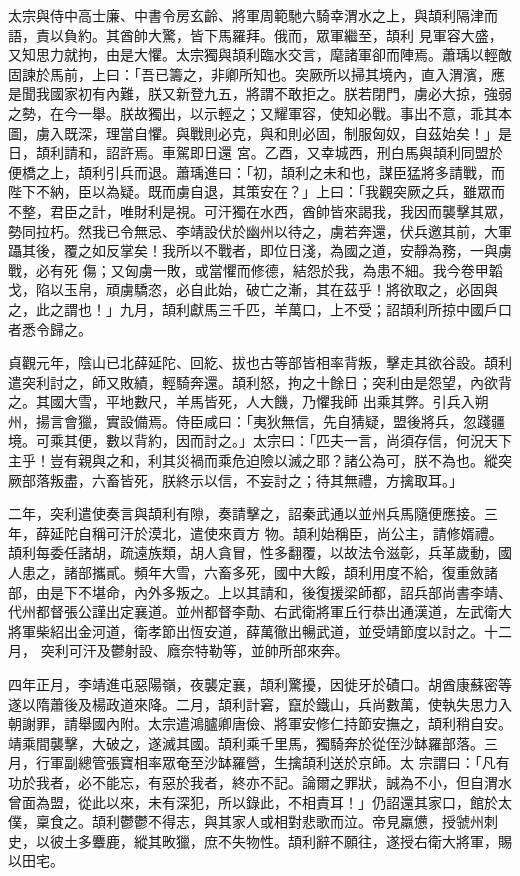 \begin{pinyinscope}
 太宗與侍中高士廉、中書令房玄齡、將軍周範馳六騎幸渭水之上，與頡利隔津而語，責以負約。其酋帥大驚，皆下馬羅拜。俄而，眾軍繼至，頡利
 見軍容大盛，又知思力就拘，由是大懼。太宗獨與頡利臨水交言，麾諸軍卻而陣焉。蕭瑀以輕敵固諫於馬前，上曰：「吾已籌之，非卿所知也。突厥所以掃其境內，直入渭濱，應是聞我國家初有內難，朕又新登九五，將謂不敢拒之。朕若閉門，虜必大掠，強弱之勢，在今一舉。朕故獨出，以示輕之；又耀軍容，使知必戰。事出不意，乖其本圖，虜入既深，理當自懼。與戰則必克，與和則必固，制服匈奴，自茲始矣！」是日，頡利請和，詔許焉。車駕即日還
 宮。乙酉，又幸城西，刑白馬與頡利同盟於便橋之上，頡利引兵而退。蕭瑀進曰：「初，頡利之未和也，謀臣猛將多請戰，而陛下不納，臣以為疑。既而虜自退，其策安在？」上曰：「我觀突厥之兵，雖眾而不整，君臣之計，唯財利是視。可汗獨在水西，酋帥皆來謁我，我因而襲擊其眾，勢同拉朽。然我已令無忌、李靖設伏於幽州以待之，虜若奔還，伏兵邀其前，大軍躡其後，覆之如反掌矣！我所以不戰者，即位日淺，為國之道，安靜為務，一與虜戰，必有死
 傷；又匈虜一敗，或當懼而修德，結怨於我，為患不細。我今卷甲韜戈，陷以玉帛，頑虜驕恣，必自此始，破亡之漸，其在茲乎！將欲取之，必固與之，此之謂也！」九月，頡利獻馬三千匹，羊萬口，上不受；詔頡利所掠中國戶口者悉令歸之。



 貞觀元年，陰山已北薛延陀、回紇、拔也古等部皆相率背叛，擊走其欲谷設。頡利遣突利討之，師又敗績，輕騎奔還。頡利怒，拘之十餘日；突利由是怨望，內欲背之。其國大雪，平地數尺，羊馬皆死，人大饑，乃懼我師
 出乘其弊。引兵入朔州，揚言會獵，實設備焉。侍臣咸曰：「夷狄無信，先自猜疑，盟後將兵，忽踐疆境。可乘其便，數以背約，因而討之。」太宗曰：「匹夫一言，尚須存信，何況天下主乎！豈有親與之和，利其災禍而乘危迫險以滅之耶？諸公為可，朕不為也。縱突厥部落叛盡，六畜皆死，朕終示以信，不妄討之；待其無禮，方擒取耳。」



 二年，突利遣使奏言與頡利有隙，奏請擊之，詔秦武通以並州兵馬隨便應接。三年，薛延陀自稱可汗於漠北，遣使來貢方
 物。頡利始稱臣，尚公主，請修婿禮。頡利每委任諸胡，疏遠族類，胡人貪冒，性多翻覆，以故法令滋彰，兵革歲動，國人患之，諸部攜貳。頻年大雪，六畜多死，國中大餒，頡利用度不給，復重斂諸部，由是下不堪命，內外多叛之。上以其請和，後復援梁師都，詔兵部尚書李靖、代州都督張公謹出定襄道。並州都督李勣、右武衛將軍丘行恭出通漢道，左武衛大將軍柴紹出金河道，衛孝節出恆安道，薛萬徹出暢武道，並受靖節度以討之。十二月，
 突利可汗及鬱射設、廕奈特勒等，並帥所部來奔。



 四年正月，李靖進屯惡陽嶺，夜襲定襄，頡利驚擾，因徙牙於磧口。胡酋康蘇密等遂以隋蕭後及楊政道來降。二月，頡利計窘，竄於鐵山，兵尚數萬，使執失思力入朝謝罪，請舉國內附。太宗遣鴻臚卿唐儉、將軍安修仁持節安撫之，頡利稍自安。靖乘間襲擊，大破之，遂滅其國。頡利乘千里馬，獨騎奔於從侄沙缽羅部落。三月，行軍副總管張寶相率眾奄至沙缽羅營，生擒頡利送於京師。太
 宗謂曰：「凡有功於我者，必不能忘，有惡於我者，終亦不記。論爾之罪狀，誠為不小，但自渭水曾面為盟，從此以來，未有深犯，所以錄此，不相責耳！」仍詔還其家口，館於太僕，稟食之。頡利鬱鬱不得志，與其家人或相對悲歌而泣。帝見羸憊，授虢州刺史，以彼土多麞鹿，縱其畋獵，庶不失物性。頡利辭不願往，遂授右衛大將軍，賜以田宅。




\end{pinyinscope}
